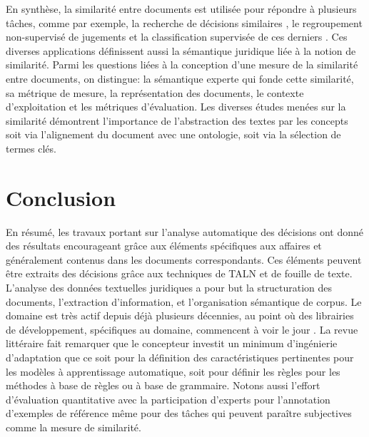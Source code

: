 En synthèse, la similarité entre documents est utilisée pour répondre à plusieurs tâches, comme par exemple, la recherche de décisions similaires \citep{thenmozhi2017legalprecedretriev}, le regroupement non-supervisé de jugements \citep{raghuveer2012legalclusteringLDA} et la classification supervisée de ces derniers \citep{ma2018wmdchinesecase}. Ces diverses applications définissent aussi la sémantique juridique liée à la notion de similarité. Parmi les questions liées à la conception d'une mesure de la similarité entre documents, on distingue: la sémantique experte qui fonde cette similarité, sa métrique de mesure, la représentation des documents, le contexte d'exploitation et les métriques d'évaluation. Les diverses études menées sur la similarité démontrent l'importance de l'abstraction des textes par les concepts soit via l'alignement du document avec une ontologie, soit via la sélection de termes clés.

\section{Conclusion}
\label{sec:literature:conclusion}
En résumé, les travaux portant sur l'analyse automatique des décisions ont donné des résultats encourageant grâce aux éléments spécifiques aux affaires et généralement contenus dans les documents correspondants. Ces éléments peuvent être extraits des décisions grâce aux techniques de TALN et de fouille de texte.  L'analyse des données textuelles juridiques a pour but la structuration des documents, l'extraction d'information, et l'organisation sémantique de corpus. Le domaine est très actif depuis déjà plusieurs décennies, au point où des librairies de développement, spécifiques au domaine, commencent à voir le jour \citep{bommarito2018lexnlp}. La revue littéraire fait remarquer que le concepteur investit un minimum d'ingénierie d'adaptation que ce soit pour la définition des caractéristiques pertinentes pour les modèles à apprentissage automatique, soit pour définir les règles pour les méthodes à base de règles ou à base de grammaire. Notons aussi l'effort d'évaluation quantitative avec la participation d'experts pour l'annotation d'exemples de référence même pour des tâches qui peuvent paraître subjectives comme la mesure de similarité.



